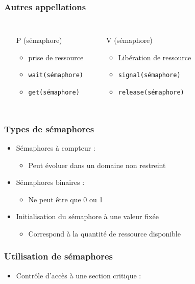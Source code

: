 \begin{frame}
\frametitle{Autres appellations}
\begin{columns}
\begin{itemize}
\item[P] (sémaphore)
\begin{itemize}
\item prise de ressource

\item \texttt{wait(sémaphore)}
\item \texttt{get(sémaphore)}
\end{itemize}
\end{itemize}
\begin{itemize}
\item[V] (sémaphore)
\begin{itemize}
\item Libération de ressource

\item \texttt{signal(sémaphore)}
\item \texttt{release(sémaphore)}
\end{itemize}
\end{itemize}
\end{columns}
\end{frame}

\begin{frame}
\frametitle{Types de sémaphores}
\begin{itemize}
\item Sémaphores à compteur :
\begin{itemize}
\item Peut évoluer dans un domaine non restreint
\end{itemize}
\item Sémaphores binaires :
\begin{itemize}
\item Ne peut être que 0 ou 1
\end{itemize}
\item Initialisation du sémaphore à une valeur fixée
\begin{itemize}
\item Correspond à la quantité de ressource disponible
\end{itemize}
\end{itemize}
\end{frame}

\begin{frame}
\frametitle{Utilisation de sémaphores}
\begin{itemize}
\item Contrôle d’accès à une section critique :

\end{itemize}
\end{frame}

